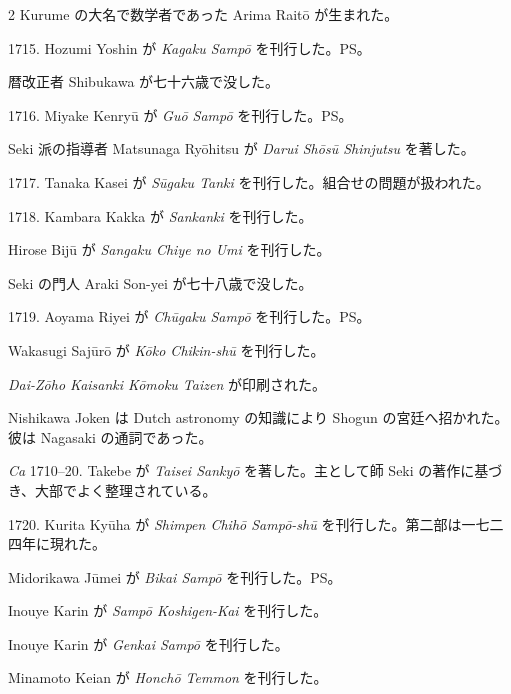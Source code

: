 \documentclass[11pt]{article}
\newcommand{\scanfooter}{}
\begin{document}
\begin{multicols}{2}
Kurume の大名で数学者であった Arima Raitō が生まれた。

1715. Hozumi Yoshin が \emph{Kagaku Sampō} を刊行した。PS。

暦改正者 Shibukawa が七十六歳で没した。

1716. Miyake Kenryū が \emph{Guō Sampō} を刊行した。PS。

Seki 派の指導者 Matsunaga Ryōhitsu が \emph{Darui Shōsū Shinjutsu} を著した。

1717. Tanaka Kasei が \emph{Sūgaku Tanki} を刊行した。組合せの問題が扱われた。

1718. Kambara Kakka が \emph{Sankanki} を刊行した。

Hirose Bijū が \emph{Sangaku Chiye no Umi} を刊行した。

Seki の門人 Araki Son-yei が七十八歳で没した。

1719. Aoyama Riyei が \emph{Chūgaku Sampō} を刊行した。PS。

Wakasugi Sajūrō が \emph{Kōko Chikin-shū} を刊行した。

\emph{Dai-Zōho Kaisanki Kōmoku Taizen} が印刷された。

Nishikawa Joken は Dutch astronomy の知識により Shogun の宮廷へ招かれた。彼は Nagasaki の通詞であった。

\emph{Ca} 1710--20. Takebe が \emph{Taisei Sankyō} を著した。主として師 Seki の著作に基づき、大部でよく整理されている。

1720. Kurita Kyūha が \emph{Shimpen Chihō Sampō-shū} を刊行した。第二部は一七二四年に現れた。

Midorikawa Jūmei が \emph{Bikai Sampō} を刊行した。PS。

Inouye Karin が \emph{Sampō Koshigen-Kai} を刊行した。

Inouye Karin が \emph{Genkai Sampō} を刊行した。

Minamoto Keian が \emph{Honchō Temmon} を刊行した。
\end{multicols}
\scanfooter
\end{document}
